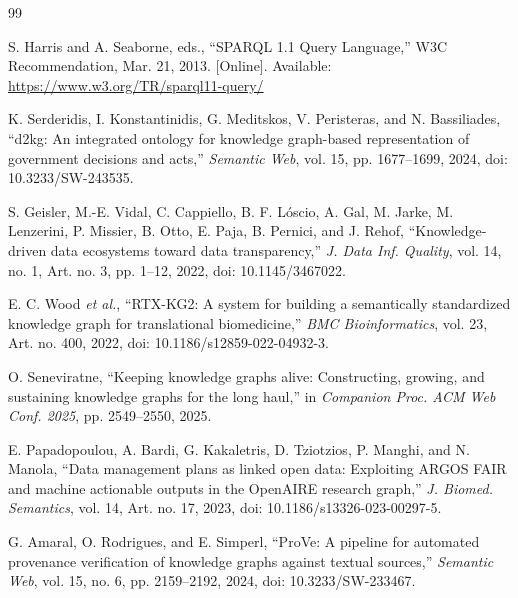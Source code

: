 \documentclass[journal]{IEEEtran}
\begin{document}
%
%
%
\begin{thebibliography}{99}

S. Harris and A. Seaborne, eds.,
``SPARQL 1.1 Query Language,''
W3C Recommendation, Mar. 21, 2013. [Online]. Available:
\url{https://www.w3.org/TR/sparql11-query/}

K. Serderidis, I. Konstantinidis, G. Meditskos, V. Peristeras, and N. Bassiliades,
``d2kg: An integrated ontology for knowledge graph-based representation of government decisions and acts,''
\emph{Semantic Web}, vol. 15, pp. 1677--1699, 2024,
doi: 10.3233/SW-243535.

S. Geisler, M.-E. Vidal, C. Cappiello, B. F. L\'{o}scio, A. Gal,
M. Jarke, M. Lenzerini, P. Missier, B. Otto, E. Paja, B. Pernici, and J. Rehof,
``Knowledge-driven data ecosystems toward data transparency,''
\emph{J. Data Inf. Quality}, vol. 14, no. 1, Art. no. 3,
pp. 1--12, 2022, doi: 10.1145/3467022.

E. C. Wood \emph{et al.},
``RTX-KG2: A system for building a semantically standardized knowledge graph for translational biomedicine,''
\emph{BMC Bioinformatics}, vol. 23, Art. no. 400, 2022,
doi: 10.1186/s12859-022-04932-3.

O. Seneviratne,
``Keeping knowledge graphs alive: Constructing, growing, and sustaining knowledge graphs for the long haul,''
in \emph{Companion Proc. ACM Web Conf. 2025}, pp. 2549--2550, 2025.

E. Papadopoulou, A. Bardi, G. Kakaletris, D. Tziotzios, P. Manghi, and N. Manola,
``Data management plans as linked open data: Exploiting ARGOS FAIR and machine actionable outputs in the OpenAIRE research graph,''
\emph{J. Biomed. Semantics}, vol. 14, Art. no. 17, 2023,
doi: 10.1186/s13326-023-00297-5.

G. Amaral, O. Rodrigues, and E. Simperl,
``ProVe: A pipeline for automated provenance verification of knowledge graphs against textual sources,''
\emph{Semantic Web}, vol. 15, no. 6, pp. 2159--2192, 2024,
doi: 10.3233/SW-233467.


\end{thebibliography}
\end{document}
